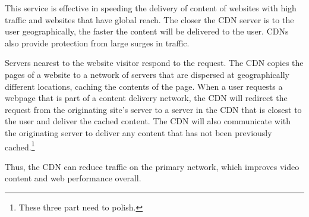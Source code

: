\documentclass{article}
\begin{document}
This service is effective in speeding the delivery of content of websites with high traffic and websites that have global reach. The closer the CDN server is to the user geographically, the faster the content will be delivered to the user. CDNs also provide protection from large surges in traffic.

Servers nearest to the website visitor respond to the request. The CDN copies the pages of a website to a network of servers that are dispersed at geographically different locations, caching the contents of the page. When a user requests a webpage that is part of a content delivery network, the CDN will redirect the request from the originating site's server to a server in the CDN that is closest to the user and deliver the cached content. The CDN will also communicate with the originating server to deliver any content that has not been previously cached.\footnote{These three part need to polish.}

Thus, the CDN can reduce traffic on the primary network, which improves video content and web performance overall.


 
\end{document}

